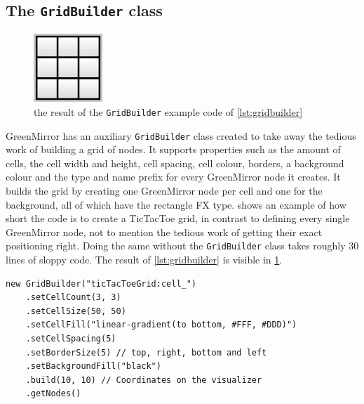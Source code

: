 \subsection{The \texttt{GridBuilder} class}\label{sec:features;sub:gridbuilder}
\begin{figure}\vspace{-22pt}
  \begin{center}
    \includegraphics[width=0.23\textwidth]{images/grid}
  \end{center}
  \vspace{-10pt}\caption{the result of the \lstinline{GridBuilder} example code of \cref{lst:gridbuilder}}\vspace{-20pt}
  \label{fig:grid}
\end{figure}
GreenMirror has an auxiliary \lstinline{GridBuilder} class created to take away the tedious work of building a grid of nodes. It supports properties such as the amount of cells, the cell width and height, cell spacing, cell colour, borders, a background colour and the type and name prefix for every GreenMirror node it creates. It builds the grid by creating one GreenMirror node per cell and one for the background, all of which have the rectangle FX type.  shows an example of how short the code is to create a TicTacToe grid, in contrast to defining every single GreenMirror node, not to mention the tedious work of getting their exact positioning right. Doing the same without the \lstinline{GridBuilder} class takes roughly 30 lines of sloppy code. The result of \cref{lst:gridbuilder} is visible in \cref{fig:grid}.
\begin{lstlisting}[label={lst:gridbuilder}, caption={example code the user can use to build a grid of nodes}]
new GridBuilder("ticTacToeGrid:cell_")
    .setCellCount(3, 3)
    .setCellSize(50, 50)
    .setCellFill("linear-gradient(to bottom, #FFF, #DDD)")
    .setCellSpacing(5)
    .setBorderSize(5) // top, right, bottom and left
    .setBackgroundFill("black")
    .build(10, 10) // Coordinates on the visualizer
    .getNodes()
\end{lstlisting}